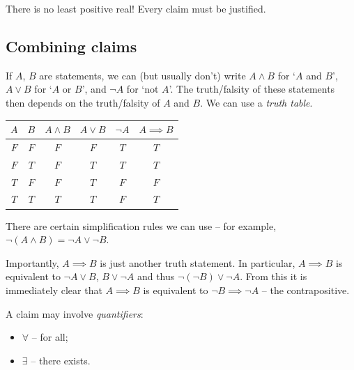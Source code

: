 \documentclass{../template/note}
\begin{document}
    \begin{remark*}
        There is no least positive real! Every claim must be justified.
    \end{remark*}
    
    \subsection{Combining claims}
    
    If \(A\), \(B\) are statements, we can (but usually don't) write \(A \wedge B\) for `\(A\) and \(B\)', \(A \vee B\) for `\(A\) or \(B\)', and \(\neg A\) for `not \(A\)'. The truth/falsity of these statements then depends on the truth/falsity of \(A\) and \(B\). We can use a \emph{truth table}.

    \begin{center}
    
        \begin{tabular}{c | c | c | c | c | c}
            \(A\) & \(B\) & \(A \wedge B\) & \(A \vee B\) & \(\neg A\) & \(A \implies B\) \\
            \hline
            \(F\) & \(F\) & \(F\) & \(F\) & \(T\) & \(T\) \\
            \(F\) & \(T\) & \(F\) & \(T\) & \(T\) & \(T\) \\
            \(T\) & \(F\) & \(F\) & \(T\) & \(F\) & \(F\) \\
            \(T\) & \(T\) & \(T\) & \(T\) & \(F\) & \(T\) \\
        \end{tabular}
        
    \end{center}

    There are certain simplification rules we can use -- for example, \(\neg (A \wedge B) = \neg A \vee \neg B\).

    Importantly, \(A \implies B\) is just another truth statement. In particular, \(A \implies B\) is equivalent to \(\neg A \vee B\), \(B \vee \neg A\) and thus \(\neg(\neg B) \vee \neg A\). From this it is immediately clear that \(A \implies B\) is equivalent to \(\neg B \implies \neg A\) -- the contrapositive.
    
    A claim may involve \emph{quantifiers}:

    \begin{itemize}
        \item \(\forall\) -- for all;
        \item \(\exists\) -- there exists.
    \end{itemize}
    
\end{document}
